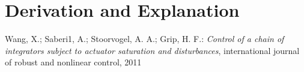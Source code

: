 \documentclass[10pt,a4paper]{article}
\begin{document}
	
	\section{Derivation and Explanation} %
	
	
	\begin{thebibliography}{10}		
		Wang, X.; Saberi1, A.; Stoorvogel, A. A.; Grip, H. F.: 
		\textit{Control of a chain of integrators subject to actuator saturation and disturbances}, international journal of robust and nonlinear control, 2011
	\end{thebibliography}
\end{document}
